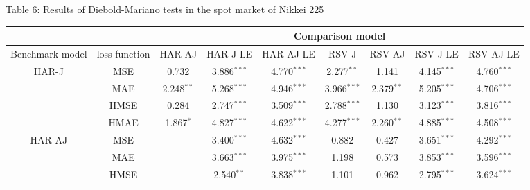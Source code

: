\documentclass[10pt]{article}
\begin{document}
\newpage
\fontsize{11pt}{14pt}\selectfont
\begin{landscape}
\begin{center}
Table 6: Results of Diebold-Mariano tests in the spot market of Nikkei 225
\end{center}


\begin{center}
\begin{tabular}{c|c|ccccccc} \hline      
                         &                    &\multicolumn{7}{c}{Comparison model} \\ \hline 
Benchmark  model&loss function  &HAR-AJ      &HAR-J-LE                    & HAR-AJ-LE                &RSV-J                       &RSV-AJ                    &RSV-J-LE                    & RSV-AJ-LE     \\ \hline 
HAR-J                &  MSE   & 0.732                  &3.886$^{\ast \ast \ast}$ &4.770$^{\ast \ast \ast}$ & 2.277$^{\ast \ast}$     &1.141                        &4.145$^{\ast \ast \ast}$ &4.760$^{\ast \ast \ast}$             \\
                        &  MAE    & 2.248$^{\ast \ast}$&5.268$^{\ast \ast \ast}$ &4.946$^{\ast \ast \ast}$&3.966$^{\ast \ast \ast}$&2.379$^{\ast \ast}$     &5.205$^{\ast \ast \ast}$&4.706$^{\ast \ast \ast}$             \\
                         &  HMSE &0.284                    &2.747$^{\ast \ast \ast}$ &3.509$^{\ast \ast \ast}$&2.788$^{\ast \ast \ast}$&1.130                        &3.123$^{\ast \ast \ast}$&3.816$^{\ast \ast \ast}$            \\
                         &  HMAE & 1.867$^{\ast}$       &4.827$^{\ast \ast \ast}$ &4.622$^{\ast \ast \ast}$ &4.277$^{\ast \ast \ast}$&2.260$^{\ast \ast}$     &4.885$^{\ast \ast \ast}$&4.508$^{\ast \ast \ast}$            \\  \hline
HAR-AJ             &  MSE            &                    &3.400$^{\ast \ast \ast}$&4.632$^{\ast \ast \ast}$&0.882                        &0.427                          &3.651$^{\ast \ast \ast}$ &4.292$^{\ast \ast \ast}$            \\
                        &  MAE            &                    &3.663$^{\ast \ast \ast}$&3.975$^{\ast \ast \ast}$&1.198                        &0.573                        &3.853$^{\ast \ast \ast}$&3.596$^{\ast \ast \ast}$             \\
                        &  HMSE          &                    &2.540$^{\ast \ast}$      &3.838$^{\ast \ast \ast}$ &1.101                       &0.962                           &2.795$^{\ast \ast \ast}$&3.624$^{\ast \ast \ast}$            \\

\end{tabular}
\end{center}
\end{landscape}
\end{document}
